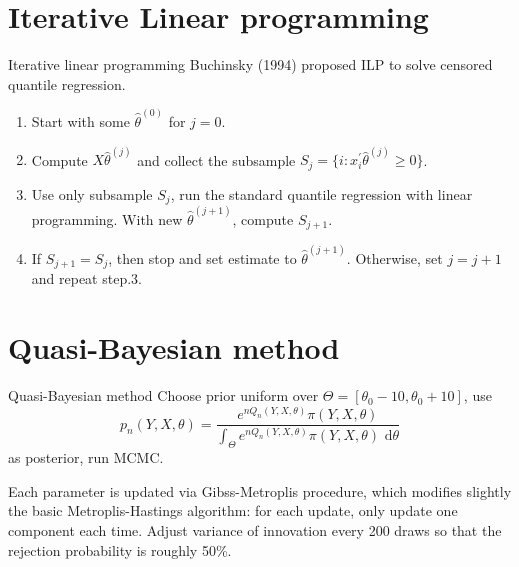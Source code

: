 \documentclass{beamer}
\begin{document}
\section{Iterative Linear programming}
\begin{frame}{Iterative linear programming}
   Buchinsky (1994) proposed ILP to solve censored quantile regression.
    \begin{enumerate}
    \item Start with some $\hat{\theta}^{(0)}$ for $j=0$.
    \item Compute $X\hat{\theta}^{(j)}$ and collect the subsample $S_j = \{ i: x_i^{'}\hat{\theta}^{(j)}\geq 0 \}$.
    \item Use only subsample $S_j$, run the standard quantile regression with linear programming. With new $\hat{\theta}^{(j+1)}$, compute $S_{j+1}$.
    \item If $S_{j+1} = S_j$, then stop and set estimate to $\hat{\theta}^{(j+1)}$. Otherwise, set $j=j+1$ and repeat step.3.
\end{enumerate}
\end{frame}

\section{Quasi-Bayesian method}
\begin{frame}{Quasi-Bayesian method}
    Choose prior uniform over $\Theta = [\theta_0-10,\theta_0+10]$, use
    \begin{equation*}
        p_n(Y,X,\theta)=\frac{e^{nQ_n(Y,X,\theta)}\pi(Y,X,\theta)}{\int_{\Theta}e^{nQ_n(Y,X,\theta)}\pi(Y,X,\theta)\mbox{ d}\theta }
    \end{equation*}
    as posterior, run MCMC.

    Each parameter is updated via Gibss-Metroplis procedure, which modifies slightly the basic Metroplis-Hastings algorithm: for each update, only update one component each time. Adjust variance of innovation every 200 draws so that the rejection probability is roughly 50\%.
    
\end{frame}
\end{document}
